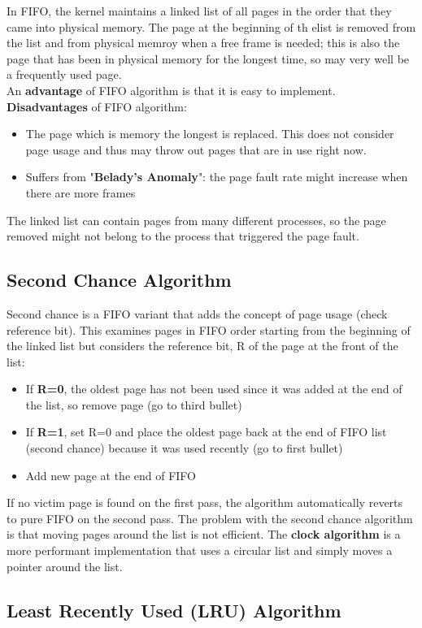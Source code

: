 \documentclass{article}
\newcommand{\bold}[1]{\textbf{#1}}
\renewcommand{\b}{\item[$\circ$]}
\newcommand{\newlist}{\begin{itemize}}
\renewcommand{\endlist}{\end{itemize}}
\begin{document}
In FIFO, the kernel maintains a linked list of all pages in the order that they came into physical memory. The page at the beginning of th elist is removed from the list and from physical memroy when a free frame is needed; this is also the page that has been in physical memory for the longest time, so may very well be a frequently used page. \\

An \bold{advantage} of FIFO algorithm is that it is easy to implement. \\ 

\bold{Disadvantages} of FIFO algorithm:
\newlist
\b The page which is memory the longest is replaced. This does not consider page usage and thus may throw out pages that are in use right now. 
\b Suffers from "\bold{Belady's Anomaly}": the page fault rate might increase when there are more frames
\endlist

The linked list can contain pages from many different processes, so the page removed might not belong to the process that triggered the page fault. 

\subsection{Second Chance Algorithm}

Second chance is a FIFO variant that adds the concept of page usage (check reference bit). This examines pages in FIFO order starting from the beginning of the linked list but considers the reference bit, R of the page at the front of the list:

\newlist 
\b If \bold{R=0}, the oldest page has not been used since it was added at the end of the list, so remove page (go to third bullet)
\b If \bold{R=1}, set R=0 and place the oldest page back at the end of FIFO list (second chance) because it was used recently (go to first bullet)
\b Add new page at the end of FIFO
\endlist

If no victim page is found on the first pass, the algorithm automatically reverts to pure FIFO on the second pass. The problem with the second chance algorithm is that moving pages around the list is not efficient. The \bold{clock algorithm} is a more performant implementation that uses a circular list and simply moves a pointer around the list. 

\subsection{Least Recently Used (LRU) Algorithm}
\end{document}
